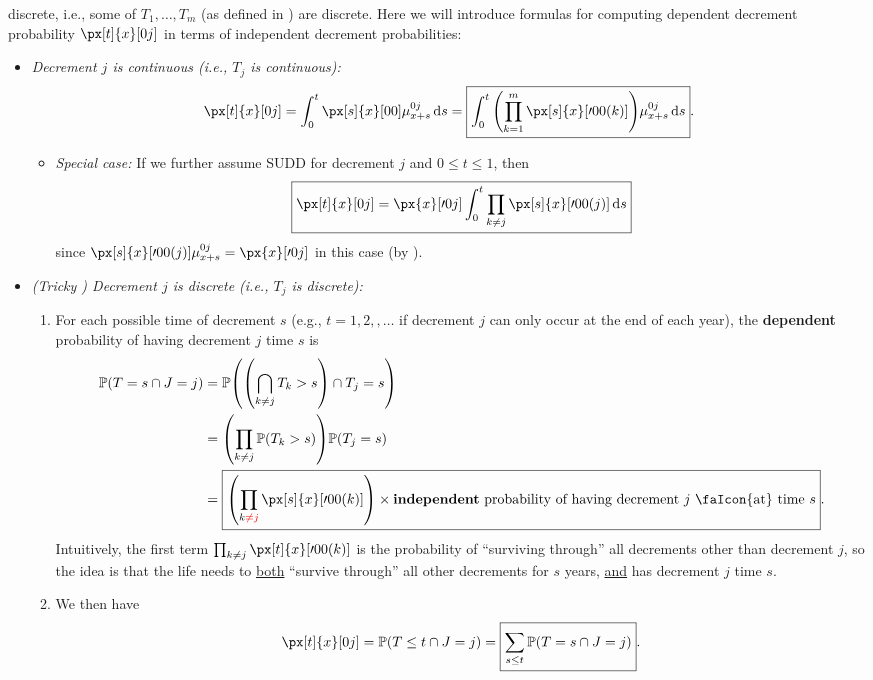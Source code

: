 \begin{enumerate}
discrete, i.e., some of \(T_1,\dotsc,T_m\) (as defined in
) are discrete. Here we will introduce formulas for
computing dependent decrement probability \(\px[t]{x}[0j]\) in terms of
independent decrement probabilities:
\begin{itemize}
\item \emph{Decrement \(j\) is continuous (i.e., \(T_j\) is continuous):}
\[
\px[t]{x}[0j]=\int_{0}^{t}\px[s]{x}[00]\mu_{x+s}^{0j}\dd{s}
=\boxed{\int_{0}^{t}\qty(\prod_{k=1}^{m}\px[s]{x}[\prime 00(k)])\mu_{x+s}^{0j}\dd{s}}.
\]
\begin{itemize}
\item \emph{Special case:} If we further assume SUDD for decrement \(j\) and
\(0\le t\le 1\), then
\[
\boxed{\px[t]{x}[0j]=\px{x}[\prime 0j]\int_{0}^{t}\prod_{k\ne j}^{}\px[s]{x}[\prime 00(j)]\dd{s}}
\]
since \(\px[s]{x}[\prime 00(j)]\mu_{x+s}^{0j}=\px{x}[\prime 0j]\) in this case (by ).
\end{itemize}
\item \emph{(Tricky \warn{}) Decrement \(j\) is discrete (i.e., \(T_j\) is discrete):}
\begin{enumerate}[label={(\arabic*)}]
\item For each possible time of decrement \(s\) (e.g., \(t=1,2,,\dotsc\) if
decrement \(j\) can only occur at the end of each year), the \textbf{dependent}
probability of having decrement \(j\)  time \(s\) is
\begin{align*}
\prob{T=s\cap J=j}&=\prob{\qty(\bigcap_{k\ne j}T_k>s)\cap T_j=s} \\
&=\qty(\prod_{k\ne j}^{}\prob{T_k>s})\prob{T_j=s} \\
&=\boxed{\qty(\prod_{k\rc{\ne j}}^{}\px[s]{x}[\prime 00(k)])
\times \text{\textbf{independent} probability of having decrement \(j\) \faIcon{at} time \(s\)}}. \\
\end{align*}
Intuitively, the first term \(\prod_{k\ne j}^{}\px[t]{x}[\prime 00(k)]\) is the
probability of ``surviving through'' all decrements other than decrement \(j\),
so the idea is that the life needs to \underline{both} ``survive through''
all other decrements for \(s\) years, \underline{and} has decrement \(j\)
 time \(s\).
\item We then have
\[
\px[t]{x}[0j]=\prob{T\le t\cap J=j}=\boxed{\sum_{s\le t}^{}\prob{T=s\cap J=j}}.
\]
\end{enumerate}
\end{itemize}
\end{enumerate}
